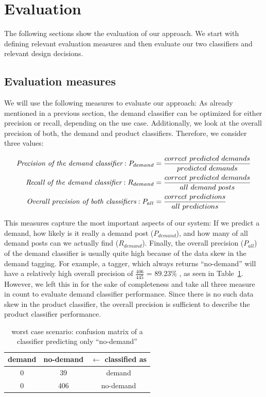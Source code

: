 
\section{Evaluation}
\label{sec:evaluation}

The following sections show the evaluation of our approach.
We start with defining relevant evaluation measures and then evaluate our two classifiers and relevant design decisions.

\subsection{Evaluation measures}
\label{sub:evaluation_measures}
We will use the following measures to evaluate our approach:
As already mentioned in a previous section, the demand classifier can be optimized for either precision or recall, depending on the use case.
Additionally, we look at the overall precision of both, the demand and product classifiers.
Therefore, we consider three values:

\begin{align*}
	\emph{Precision of the demand classifier}: P_{demand} 			&= \frac{correct~predicted~demands}{predicted~demands} \\
	\emph{Recall of the demand classifier}: R_{demand} 				&= \frac{correct~predicted~demands}{all~demand~posts} \\
	\emph{Overall precision of both classifiers}: P_{all} &= \frac{correct~predictions}{all~predictions} \\
\end{align*}

This measures capture the most important aspects of our system: If we predict a demand, how likely is it really a demand post ($P_{demand}$), and how many of all demand posts can we actually find ($R_{demand}$).
Finally, the overall precision ($P_{all}$) of the demand classifier is usually quite high because of the data skew in the demand tagging.
For example, a tagger, which always returns ``no-demand'' will have a relatively high overall precision of $\frac{406}{445}$ = $89.23\%$ , as seen in Table~\ref{table:only_no_demand_classifier}.
However, we left this in for the sake of completeness and take all three measure in count to evaluate demand classifier performance.
Since there is no such data skew in the product classifier, the overall precision is sufficient to describe the product classifier performance.

\begin{table}
	\centering
	{
		\begin{tabular}{ccc}
			demand & no-demand & $\leftarrow$ classified as \\ \hline \hline
			0 & 39 & demand\\
			0 & 406 & no-demand\\
		\end{tabular}
	}
	\caption{worst case scenario: confusion matrix of a classifier predicting only ``no-demand''}
	\label{table:only_no_demand_classifier}
\end{table}

